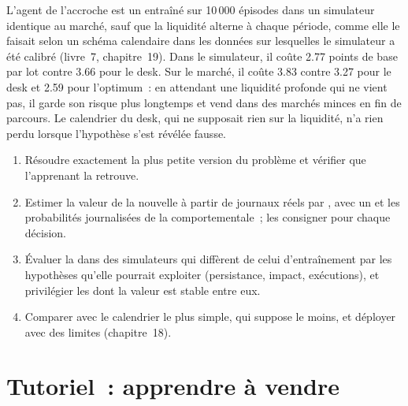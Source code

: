 L'agent de l'accroche est un  entraîné sur 10\,000 épisodes dans un simulateur identique au marché, sauf que la liquidité
alterne à chaque période, comme elle le faisait selon un schéma calendaire dans les données sur lesquelles le simulateur a été calibré (livre~7, chapitre~19). Dans
le simulateur, il coûte 2.77 points de base par lot contre 3.66 pour le desk. Sur le marché, il coûte 3.83 contre
3.27 pour le desk et 2.59 pour l'optimum~: en attendant une liquidité profonde qui ne vient pas, il garde son risque plus longtemps et vend dans des marchés minces
en fin de parcours. Le calendrier du desk, qui ne supposait rien sur la liquidité, n'a rien perdu lorsque l'hypothèse s'est révélée fausse.

\begin{method}\label{met:ml:rl:method}
\begin{enumerate}
\item Résoudre exactement la plus petite version du problème et vérifier que l'apprenant la retrouve.
\item Estimer la valeur de la nouvelle  à partir de journaux réels par , avec un  et les
probabilités journalisées de la  comportementale~; les consigner pour chaque décision.
\item Évaluer la  dans des simulateurs qui diffèrent de celui d'entraînement par les hypothèses qu'elle pourrait exploiter (persistance,
impact, exécutions), et privilégier les  dont la valeur est stable entre eux.
\item Comparer avec le calendrier le plus simple, qui suppose le moins, et déployer avec des limites (chapitre~18).
\end{enumerate}
\end{method}

\section{Tutoriel~: apprendre à vendre}\label{tut:ml:reinforcement-learning-foundations:tut}

